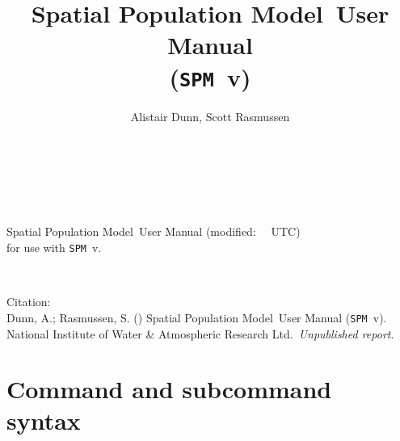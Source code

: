 \documentclass[11pt,twoside,pdftex]{article}
\renewcommand{\headrulewidth}{0pt}
\begin{document}


\newcommand{\SPM}{\texttt{SPM}}
\newcommand{\SPMName}{Spatial Population Model}
\newcommand{\VER}{\SPMversion}
\newcommand{\authors}{\href{mailto:"Alistair Dunn"<a.dunn@niwa.co.nz>?subject=SPM:}{authors}}
\newcommand{\Organisation}{National Institute of Water \& Atmospheric Research Ltd.}
\newcommand{\ManualRef}{Dunn, A.; Rasmussen, S. (\SourceControlYear) \SPMName\ User Manual (\SPM\ v\VER). \Organisation\ \emph{Unpublished report}.} 
\title{\SPMName\ User Manual \\(\SPM\ v\VER)}
\author{Alistair Dunn, Scott Rasmussen}
\date{\SourceControlMonth\ \SourceControlYear}

\maketitle 
\thispagestyle{empty}
~\vfill
\begin{center}
\SPMName\ User Manual 
(modified: \SourceControlDate\ \SourceControlTime\ UTC) \\
for use with \SPM\ v\VER.
\end{center}

\cleardoublepage{}
\fancyfoot[C]{\thepage}
~\vfill
\begin{center}
{Citation:\\ \ManualRef}
\end{center}

\cleardoublepage{}
\tableofcontents{}

\cleardoublepage{}
\renewcommand{\headrulewidth}{0.2pt}
\fancyhead[LE]{\slshape \nouppercase \rightmark}
\fancyhead[RO]{\slshape \nouppercase \leftmark}


\cleardoublepage{}


\cleardoublepage{}


\cleardoublepage{}


\cleardoublepage{}


\cleardoublepage{}
\section{Command and subcommand syntax\label{sec:syntax}}





\cleardoublepage{}


\cleardoublepage{}


\cleardoublepage{}


\cleardoublepage{}


\cleardoublepage{}


\cleardoublepage{}


\cleardoublepage{}

\end{document}
